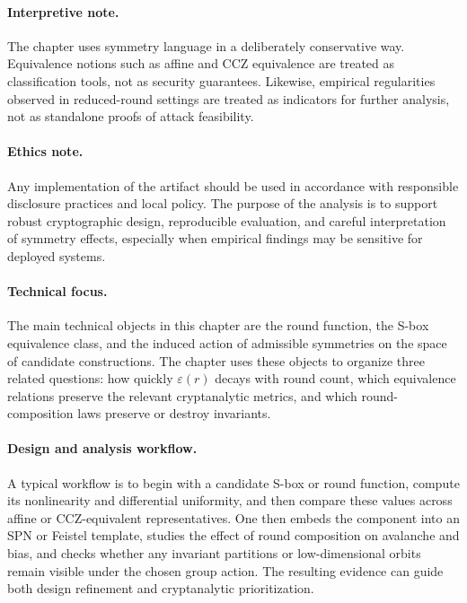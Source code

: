 \documentclass[11pt]{article}
\begin{document}
\paragraph{Interpretive note.} The chapter uses symmetry language in a deliberately conservative way. Equivalence notions such as affine and CCZ equivalence are treated as classification tools, not as security guarantees. Likewise, empirical regularities observed in reduced-round settings are treated as indicators for further analysis, not as standalone proofs of attack feasibility.

\paragraph{Ethics note.} Any implementation of the artifact should be used in accordance with responsible disclosure practices and local policy. The purpose of the analysis is to support robust cryptographic design, reproducible evaluation, and careful interpretation of symmetry effects, especially when empirical findings may be sensitive for deployed systems.

\paragraph{Technical focus.} The main technical objects in this chapter are the round function, the S-box equivalence class, and the induced action of admissible symmetries on the space of candidate constructions. The chapter uses these objects to organize three related questions: how quickly \(\varepsilon(r)\) decays with round count, which equivalence relations preserve the relevant cryptanalytic metrics, and which round-composition laws preserve or destroy invariants.

\paragraph{Design and analysis workflow.} A typical workflow is to begin with a candidate S-box or round function, compute its nonlinearity and differential uniformity, and then compare these values across affine or CCZ-equivalent representatives. One then embeds the component into an SPN or Feistel template, studies the effect of round composition on avalanche and bias, and checks whether any invariant partitions or low-dimensional orbits remain visible under the chosen group action. The resulting evidence can guide both design refinement and cryptanalytic prioritization.
\end{document}
